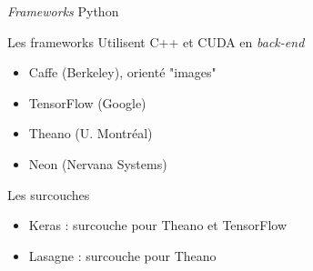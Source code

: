 \documentclass{beamer}
\begin{document}
\begin{frame}{\textit{Frameworks} Python}
\begin{block}{Les frameworks}
Utilisent C++ et CUDA en \textit{back-end}
\begin{itemize}
	\item Caffe (Berkeley), orienté "images"
    \item TensorFlow (Google)
    \item Theano (U. Montréal)
    \item Neon (Nervana Systems)
\end{itemize}
\end{block}

\begin{block}{Les surcouches}
\begin{itemize}
    \item Keras : surcouche pour Theano et TensorFlow
    \item Lasagne : surcouche pour Theano
\end{itemize}
\end{block}
\end{frame}
\end{document}
